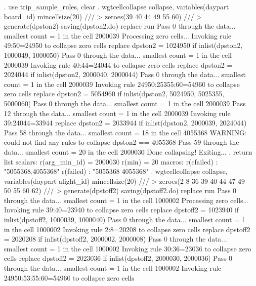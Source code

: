 . use trip_sample_rules, clear
{\smallskip}
. wgtcellcollapse collapse, variables(daypart board_id) mincellsize(20) ///
>         zeroes(39 40 44 49 55 60) ///
>         generate(dpston2) saving(dpston2.do) replace run
Pass 0 through the data...
  smallest count = 1 in the cell      2000039
{\smallskip}
Processing zero cells...
{\smallskip}
  Invoking rule 49:50=24950 to collapse zero cells
  replace dpston2 = 1024950 if inlist(dpston2, 1000049, 1000050)
Pass 0 through the data...
  smallest count = 1 in the cell      2000039
  Invoking rule 40:44=24044 to collapse zero cells
  replace dpston2 = 2024044 if inlist(dpston2, 2000040, 2000044)
\smallskip
\oom
\smallskip
Pass 0 through the data...
  smallest count = 1 in the cell      2000039
  Invoking rule 24950:25355:60=54960 to collapse zero cells
  replace dpston2 = 5054960 if inlist(dpston2, 5024950, 5025355, 5000060)
Pass 0 through the data...
  smallest count = 1 in the cell      2000039
Pass 12 through the data...
  smallest count = 1 in the cell      2000039
  Invoking rule 39:24044=33944
  replace dpston2 = 2033944 if inlist(dpston2, 2000039, 2024044)
\smallskip
\oom
\smallskip
Pass 58 through the data...
  smallest count = 18 in the cell      4055368
  WARNING: could not find any rules to collapse dpston2 == 4055368
Pass 59 through the data...
  smallest count = 20 in the cell      2000030
  Done collapsing! Exiting...
{\smallskip}
. return list
{\smallskip}
scalars:
         r(arg_min_id) =  2000030
                r(min) =  20
{\smallskip}
macros:
            r(cfailed) : "5055368,4055368"
             r(failed) : "5055368 4055368"
{\smallskip}
. wgtcellcollapse collapse, variables(daypart alight_id) mincellsize(20) ///
>         zeroes(2 8 36 39 40 44 47 49 50 55 60 62) ///
>         generate(dpstoff2) saving(dpstoff2.do) replace run
Pass 0 through the data...
  smallest count = 1 in the cell      1000002
{\smallskip}
Processing zero cells...
{\smallskip}
  Invoking rule 39:40=23940 to collapse zero cells
  replace dpstoff2 = 1023940 if inlist(dpstoff2, 1000039, 1000040)
Pass 0 through the data...
  smallest count = 1 in the cell      1000002
  Invoking rule 2:8=20208 to collapse zero cells
  replace dpstoff2 = 2020208 if inlist(dpstoff2, 2000002, 2000008)
Pass 0 through the data...
  smallest count = 1 in the cell      1000002
  Invoking rule 30:36=23036 to collapse zero cells
  replace dpstoff2 = 2023036 if inlist(dpstoff2, 2000030, 2000036)
\smallskip
\oom
\smallskip
Pass 0 through the data...
  smallest count = 1 in the cell      1000002
  Invoking rule 24950:53:55:60=54960 to collapse zero cells
